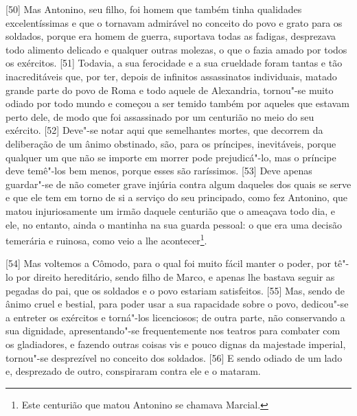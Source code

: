 {[}50{]} Mas Antonino, seu filho, foi homem que também tinha qualidades
excelentíssimas e que o tornavam admirável no conceito do povo e grato
para os soldados, porque era homem de guerra, suportava todas as
fadigas, desprezava todo alimento delicado e qualquer outras molezas, o
que o fazia amado por todos os exércitos. {[}51{]} Todavia, a sua
ferocidade e a sua crueldade foram tantas e tão inacreditáveis que, por
ter, depois de infinitos assassinatos individuais, matado grande parte
do povo de Roma e todo aquele de Alexandria, tornou"-se muito odiado por
todo mundo e começou a ser temido também por aqueles que estavam perto
dele, de modo que foi assassinado por um centurião no meio do seu
exército. {[}52{]} Deve"-se notar aqui que semelhantes mortes, que
decorrem da deliberação de um ânimo obstinado, são, para os príncipes,
inevitáveis, porque qualquer um que não se importe em morrer pode
prejudicá"-lo, mas o príncipe deve temê"-los bem menos, porque esses são
raríssimos. {[}53{]} Deve apenas guardar"-se de não cometer grave injúria
contra algum daqueles dos quais se serve e que ele tem em torno de si a
serviço do seu principado, como fez Antonino, que matou injuriosamente
um irmão daquele centurião que o ameaçava todo dia, e ele, no entanto,
ainda o mantinha na sua guarda pessoal: o que era uma decisão temerária
e ruinosa, como veio a lhe acontecer\footnote{Este centurião que matou
  Antonino se chamava Marcial.}.

{[}54{]} Mas voltemos a Cômodo, para o qual foi muito fácil manter o
poder, por tê"-lo por direito hereditário, sendo filho de Marco, e apenas
lhe bastava seguir as pegadas do pai, que os soldados e o povo estariam
satisfeitos. {[}55{]} Mas, sendo de ânimo cruel e bestial, para poder
usar a sua rapacidade sobre o povo, dedicou"-se a entreter os exércitos e
torná"-los licenciosos; de outra parte, não conservando a sua dignidade,
apresentando"-se frequentemente nos teatros para combater com os
gladiadores, e fazendo outras coisas vis e pouco dignas da majestade
imperial, tornou"-se desprezível no conceito dos soldados. {[}56{]} E
sendo odiado de um lado e, desprezado de outro, conspiraram contra ele e
o mataram.

